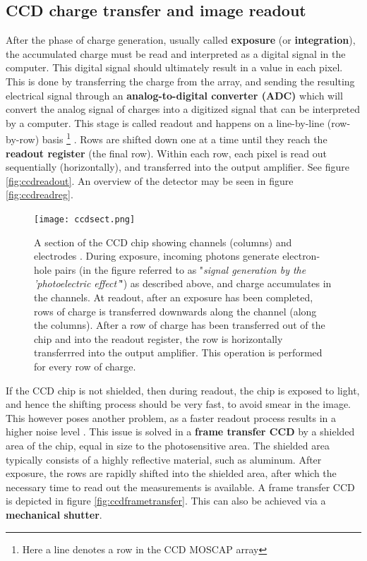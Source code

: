 \documentclass[../main.tex]{subfiles}
\begin{document}
	\subsection{CCD charge transfer and image readout}
	After the phase of charge generation, usually called \textbf{exposure} (or \textbf{integration}), the accumulated charge must be read and interpreted as a digital signal in the computer. This digital signal should ultimately result in a value in each pixel\cite{handbookofccdastronomy}. This is done by transferring the charge from the array, and sending the resulting electrical signal through an \textbf{analog-to-digital converter (ADC)} which will convert the analog signal of charges into a digitized signal that can be interpreted by a computer. This stage is called readout and happens on a line-by-line (row-by-row) basis \footnote{Here a line denotes a row in the CCD MOSCAP array} \cite{teledyneart}. Rows are shifted down one at a time until they reach the \textbf{readout register} (the final row). Within each row, each pixel is read out sequentially (horizontally), and transferred into the output amplifier. See figure \ref{fig:ccdreadout}. An overview of the detector may be seen in figure \ref{fig:ccdreadreg}.
	
	\begin{figure}[h!]
		\centering
		\texttt{[image: ccdsect.png]}
		\caption{A section of the CCD chip showing channels (columns) and electrodes \cite{teledyneart}. During exposure, incoming photons generate electron-hole pairs (in the figure referred to as "\textit{signal generation by the 'photoelectric effect'}") as described above, and charge accumulates in the channels. At readout, after an exposure has been completed, rows of charge is transferred downwards along the channel (along the columns). After a row of charge has been transferred out of the chip and into the readout register, the row is horizontally transferrred into the output amplifier. This operation is performed for every row of charge.
		}
		\label{fig:ccdsect}
	\end{figure}
	
	If the CCD chip is not shielded, then during readout, the chip is exposed to light, and hence the shifting process should be very fast, to avoid smear in the image. This however poses another problem, as a faster readout process results in a higher noise level \cite{handbookofccdastronomy, obsAstMichrichReadout}. This issue is solved in a \textbf{frame transfer CCD} by a shielded area of the chip, equal in size to the photosensitive area\cite{ccdwiki}. The shielded area typically consists of a highly reflective material, such as aluminum. After exposure, the rows are rapidly shifted into the shielded area, after which the necessary time to read out the measurements is available\cite{obsAstMichrichReadout}. A frame transfer CCD is depicted in figure \ref{fig:ccdframetransfer}. This can also be achieved via a \textbf{mechanical shutter}. 
	
\end{document}
